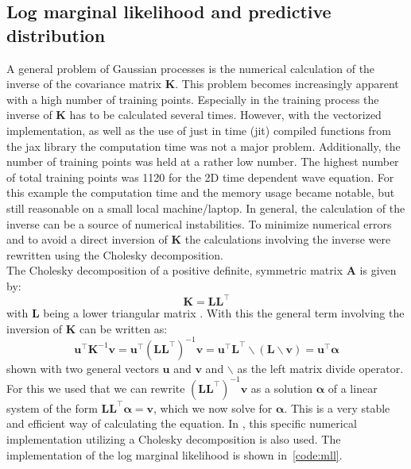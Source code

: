 \documentclass{article}
\begin{document}
\subsection{Log marginal likelihood and predictive distribution}
A general problem of Gaussian processes is the numerical calculation of the inverse of the covariance matrix $\bm{K}$. This problem becomes increasingly apparent with a high number of training points. Especially in the training process the inverse of $\bm{K}$ has to be calculated several times. However, with the vectorized implementation, as well as the use of just in time (jit) compiled functions from the jax library the computation time was not a major problem. Additionally, the number of training points was held at a rather low number. The highest number of total training points was 1120 for the 2D time dependent wave equation. For this example the computation time and the memory usage became notable, but still reasonable on a small local machine/laptop. In general, the calculation of the inverse can be a source of numerical instabilities. To minimize numerical errors and to avoid a direct inversion of $\bm{K}$ the calculations involving the inverse were rewritten using the Cholesky decomposition. \\
The Cholesky decomposition of a positive definite, symmetric matrix $\bm{A}$ is given by:
\begin{equation}
    \bm{K} = \bm{L}\bm{L}^\intercal
\end{equation}
with $\bm{L}$ being a lower triangular matrix \cite{RasmussenCarlEdward}. With this the general term involving the inversion of $\bm{K}$ can be written as:
\begin{equation}
    \label{eq:inv_K}
    \bm{u}^\intercal \bm{K}^{-1}\bm{v} = \bm{u}^\intercal (\bm{LL^{\intercal}})^{-1} \bm{v} = \bm{u}^\intercal \bm{L^{\intercal} \backslash (L\backslash \bm{v})} = \bm{u}^\intercal \bm{\alpha}
\end{equation}
shown with two general vectors $\bm{u}$ and $\bm{v}$ and $\backslash$ as the left matrix divide operator. For this we used that we can rewrite $(\bm{LL^{\intercal}})^{-1} \bm{v}$ as a solution $\bm{\alpha}$ of a linear system of the form $\bm{LL^{\intercal}} \bm{\alpha}=\bm{v}$, which we now solve for $\bm{\alpha}$.
This is a very stable and efficient way of calculating the equation. In \cite{RasmussenCarlEdward}, this specific numerical implementation utilizing a Cholesky decomposition is also used. The implementation of the log marginal likelihood is shown in~\ref{code:mll}.\\

\end{document}
